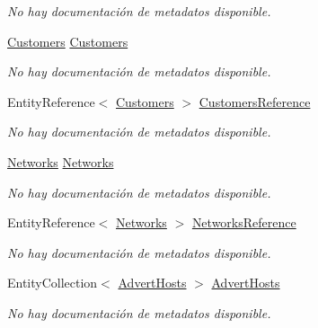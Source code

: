 \begin{DoxyCompactItemize}
\begin{DoxyCompactList}\small\item\em No hay documentación de metadatos disponible. \end{DoxyCompactList}\item 
\hyperlink{class_game_memory_1_1_customers}{Customers} \hyperlink{class_game_memory_1_1_advert_campaigns_aa63acf86fef731a20b8d1b4b6842fa54}{Customers}
\begin{DoxyCompactList}\small\item\em No hay documentación de metadatos disponible. \end{DoxyCompactList}\item 
Entity\-Reference$<$ \hyperlink{class_game_memory_1_1_customers}{Customers} $>$ \hyperlink{class_game_memory_1_1_advert_campaigns_a3a0f33054dc2f41e592a3504783abfa8}{Customers\-Reference}
\begin{DoxyCompactList}\small\item\em No hay documentación de metadatos disponible. \end{DoxyCompactList}\item 
\hyperlink{class_game_memory_1_1_networks}{Networks} \hyperlink{class_game_memory_1_1_advert_campaigns_a93fb9fb1604fb97b196e6cd7186270cf}{Networks}
\begin{DoxyCompactList}\small\item\em No hay documentación de metadatos disponible. \end{DoxyCompactList}\item 
Entity\-Reference$<$ \hyperlink{class_game_memory_1_1_networks}{Networks} $>$ \hyperlink{class_game_memory_1_1_advert_campaigns_a31ed9dd24ca6e2155bc0f19a55053e63}{Networks\-Reference}
\begin{DoxyCompactList}\small\item\em No hay documentación de metadatos disponible. \end{DoxyCompactList}\item 
Entity\-Collection$<$ \hyperlink{class_game_memory_1_1_advert_hosts}{Advert\-Hosts} $>$ \hyperlink{class_game_memory_1_1_advert_campaigns_a448c21e840bad8b62dbda780cb093f0e}{Advert\-Hosts}
\begin{DoxyCompactList}\small\item\em No hay documentación de metadatos disponible. \end{DoxyCompactList}\end{DoxyCompactItemize}


